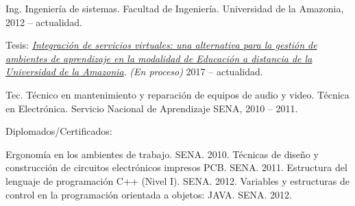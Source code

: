 \documentclass[letterpaper]{article}
\renewenvironment{itemize}{
  \begin{list}{}{
    \setlength{\leftmargin}{1.5em}
  }
}{
  \end{list}
}
\begin{document}
\begin{itemize}
  \item Ing. Ingenier\'ia de sistemas. Facultad de Ingenier\'ia. Universidad de la Amazonia, 2012 -- actualidad.
  
	  \leftskip 0.5in
	  \parindent -0.5in
	  \subitem Tesis: \href{https://github.com/juliandavidmr/Grado}{\emph{Integraci\'on de servicios virtuales: una alternativa para la gesti\'on de ambientes de aprendizaje en la modalidad de Educaci\'on a distancia de la Universidad de la Amazonia}}. \textit{(En proceso)} 2017 -- actualidad.

  \leftskip 0in
  \item Tec. T\'ecnico en mantenimiento y reparaci\'on de equipos de audio y video. T\'ecnica en Electr\'onica. Servicio Nacional de Aprendizaje SENA, 2010 -- 2011.
  
  \item Diplomados/Certificados:
  
  	  \leftskip 0.5in
	  \subitem Ergonom\'ia en los ambientes de trabajo. SENA. 2010.
	  \subitem T\'ecnicas de dise\~no y construcci\'on de circuitos electr\'onicos impresos PCB. SENA. 2011.
	  \subitem Estructura del lenguaje de programaci\'on C++ (Nivel I). SENA. 2012.
	  \subitem Variables y estructuras de control en la programaci\'on orientada a objetos: JAVA. SENA. 2012.
  
\end{itemize}
\end{document}
